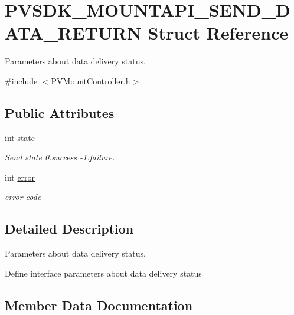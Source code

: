 \hypertarget{struct_p_v_s_d_k___m_o_u_n_t_a_p_i___s_e_n_d___d_a_t_a___r_e_t_u_r_n}{}\section{P\+V\+S\+D\+K\+\_\+\+M\+O\+U\+N\+T\+A\+P\+I\+\_\+\+S\+E\+N\+D\+\_\+\+D\+A\+T\+A\+\_\+\+R\+E\+T\+U\+RN Struct Reference}
\label{struct_p_v_s_d_k___m_o_u_n_t_a_p_i___s_e_n_d___d_a_t_a___r_e_t_u_r_n}


Parameters about data delivery status.  




{\ttfamily \#include $<$P\+V\+Mount\+Controller.\+h$>$}

\subsection*{Public Attributes}
\begin{DoxyCompactItemize}
\item 
int \hyperlink{struct_p_v_s_d_k___m_o_u_n_t_a_p_i___s_e_n_d___d_a_t_a___r_e_t_u_r_n_ae87180c283f3fdaaffdaf713e14eacd3}{state}
\begin{DoxyCompactList}\small\item\em Send state 0\+:success -\/1\+:failure. \end{DoxyCompactList}\item 
int \hyperlink{struct_p_v_s_d_k___m_o_u_n_t_a_p_i___s_e_n_d___d_a_t_a___r_e_t_u_r_n_a40696060476ab7bcb90b741d2b4dde18}{error}
\begin{DoxyCompactList}\small\item\em error code \end{DoxyCompactList}\end{DoxyCompactItemize}


\subsection{Detailed Description}
Parameters about data delivery status. 

Define interface parameters about data delivery status 

\subsection{Member Data Documentation}
\mbox{\label{struct_p_v_s_d_k___m_o_u_n_t_a_p_i___s_e_n_d___d_a_t_a___r_e_t_u_r_n_a40696060476ab7bcb90b741d2b4dde18}} 
